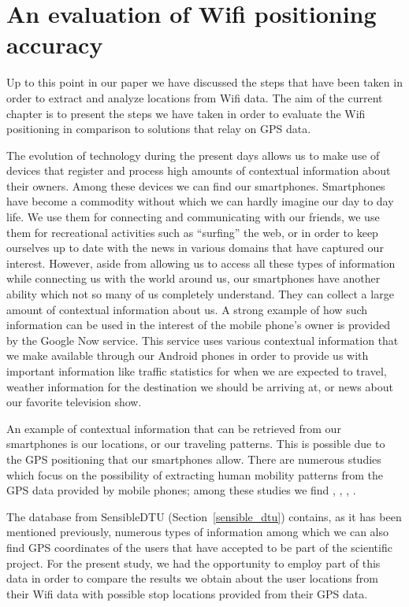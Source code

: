 \chapter{An evaluation of Wifi positioning accuracy} 

Up to this point in our paper we have discussed the steps that have been
taken in order to extract and analyze locations from Wifi data. The aim of the
current chapter is to present the steps we have taken in order to evaluate the
Wifi positioning in comparison to solutions that relay on GPS data.

The evolution of technology during the present days allows us to make use of
devices that register and process high amounts of contextual information about
their owners. Among these devices we can find our smartphones. Smartphones have
become a commodity without which we can hardly imagine our day to day life. We
use them for connecting and communicating with our friends, we use them for
recreational activities such as ``surfing'' the web, or in order to keep
ourselves up to date with the news in various domains that have captured our
interest. However, aside from allowing us to access all these types of
information while connecting us with the world around us, our smartphones have
another ability which not so many of us completely understand. They can collect
a large amount of contextual information about us. A strong example of how such
information can be used in the interest of the mobile phone's owner is provided
by the Google Now \cite{GN} service. This service uses various contextual
information that we make available through our Android phones in order to
provide us with important information like traffic statistics for when we are
expected to travel, weather information for the destination we should be
arriving at, or news about our favorite television show.

An example of contextual information that can be retrieved from our smartphones
is our locations, or our traveling patterns. This is possible due to the GPS
positioning that our smartphones allow. There are numerous studies which focus
on the possibility of extracting human mobility patterns from the GPS data
provided by mobile phones; among these studies we find
\cite{Montoliu:2010:DHP:1899475.1899487},
\cite{cuttone2014inferring},
\cite{Zhou:2007:DPM:1247715.1247718}, \cite{Ashbrook:2003:UGL:945305.945310}.

The database from SensibleDTU (Section~\ref{sensible_dtu}) contains, as it has
been mentioned previously, numerous types of information among which we can also
find GPS coordinates of the users that have accepted to be part of the
scientific project. For the present study, we had the opportunity to employ part
of this data in order to compare the results we obtain about the user locations
from their Wifi data with possible stop locations provided from their GPS data.

